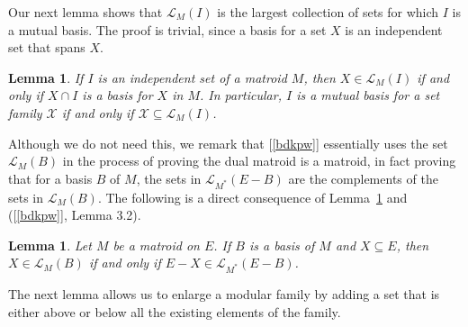 \documentclass{amsart}
\theoremstyle{plain}
\newtheorem{lemma}[theorem]{Lemma}
\theoremstyle{definition}
\newcommand{\cL}{\mathcal{L}}
\newcommand{\cX}{\mathcal{X}}
\renewcommand{\ss}{\subseteq}
\begin{document}
Our next lemma shows that $\cL_M(I)$ is the largest collection of sets for which $I$ is a mutual basis.
The proof is trivial, since a basis for a set $X$ is an independent set that spans $X$. 

\begin{lemma}\label{mutbasisiffsubset}
  If $I$ is an independent set of a matroid $M$, then $X \in \cL_M(I)$ if and only if $X \cap I$ is a basis for $X$ in $M$. 
  In particular, $I$ is a mutual basis for a set family $\cX$ if and only if $\cX \ss \cL_M(I)$. 
\end{lemma}

Although we do not need this, 
we remark that [\ref{bdkpw}] essentially uses the set $\cL_M(B)$ in the process of proving the dual matroid is a matroid, 
in fact proving that for a basis $B$ of $M$, the sets in $\cL_{M^*}(E-B)$ are the complements of the sets in $\cL_M(B)$. 
The following is a direct consequence of Lemma~\ref{mutbasisiffsubset} and ([\ref{bdkpw}], Lemma 3.2).

\begin{lemma}\label{blatticedual}
  Let $M$ be a matroid on $E$. If $B$ is a basis of $M$ and $X \ss E$, 
  then $X \in \cL_M(B)$ if and only if $E - X \in \cL_{M^*}(E-B)$. 
\end{lemma}





The next lemma allows us to enlarge a modular family by adding a set that is either above or below
all the existing elements of the family. 
\end{document}
